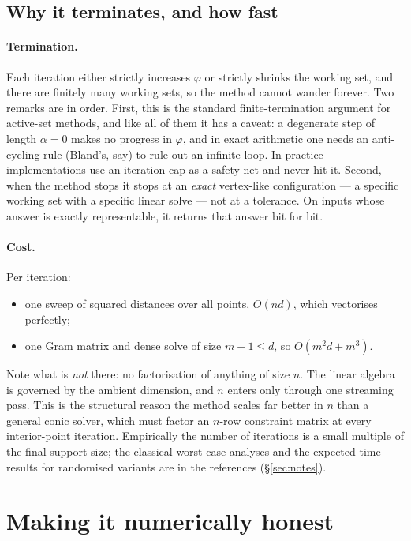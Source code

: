 \documentclass[11pt,a4paper]{article}
\theoremstyle{plain}
\theoremstyle{definition}
\theoremstyle{remark}
\begin{document}
\subsection{Why it terminates, and how fast}

\paragraph{Termination.} Each iteration either strictly increases $\varphi$ or
strictly shrinks the working set, and there are finitely many working sets, so the
method cannot wander forever. Two remarks are in order. First, this is the
standard finite-termination argument for active-set methods, and like all of them
it has a caveat: a degenerate step of length $\alpha=0$ makes no progress in
$\varphi$, and in exact arithmetic one needs an anti-cycling rule (Bland's, say)
to rule out an infinite loop. In practice implementations use an iteration cap as
a safety net and never hit it. Second, when the method stops it stops at an
\emph{exact} vertex-like configuration --- a specific working set with a specific
linear solve --- not at a tolerance. On inputs whose answer is exactly
representable, it returns that answer bit for bit.

\paragraph{Cost.} Per iteration:
\begin{itemize}
  \item one sweep of squared distances over all points, $O(nd)$, which vectorises
    perfectly;
  \item one Gram matrix and dense solve of size $m-1 \le d$, so $O(m^2 d + m^3)$.
\end{itemize}
Note what is \emph{not} there: no factorisation of anything of size $n$. The
linear algebra is governed by the ambient dimension, and $n$ enters only through
one streaming pass. This is the structural reason the method scales far better in
$n$ than a general conic solver, which must factor an $n$-row constraint matrix at
every interior-point iteration. Empirically the number of iterations is a small
multiple of the final support size; the classical worst-case analyses and the
expected-time results for randomised variants are in the references
(\S\ref{sec:notes}).

\section{Making it numerically honest}
\label{sec:numerics}
\end{document}

